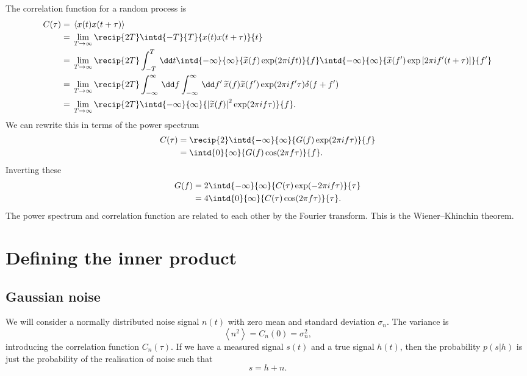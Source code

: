 The correlation function for a random process is
\begin{align}
C(\tau) = {} & \left\langle x(t)x(t + \tau)\right\rangle \\
 = {} & \lim_{T \rightarrow \infty} \recip{2T} \intd{-T}{T}{x(t)x(t + \tau)}{t} \nonumber \\
 = {} & \lim_{T \rightarrow \infty} \recip{2T} \int_{-T}^{T}\,\dd t \intd{-\infty}{\infty}{\widetilde{x}(f)\exp(2\pi ift)}{f} \intd{-\infty}{\infty}{\widetilde{x}(f')\exp\left[2\pi if'(t + \tau)\right]}{f'} \nonumber \\
 = {} & \lim_{T \rightarrow \infty} \recip{2T} \int_{-\infty}^{\infty}\,\dd f \int_{-\infty}^{\infty}\,\dd f' \, \widetilde{x}(f)\widetilde{x}(f')\exp(2\pi if'\tau)\delta(f + f') \nonumber \\
 = {} & \lim_{T \rightarrow \infty} \recip{2T} \intd{-\infty}{\infty}{\left|\widetilde{x}(f)\right|^2\exp(2\pi if\tau)}{f}.
\end{align}
We can rewrite this in terms of the power spectrum
\begin{align}
C(\tau) = {} & \recip{2} \intd{-\infty}{\infty}{G(f)\exp(2\pi if\tau)}{f} \\
 = {} & \intd{0}{\infty}{G(f)\cos(2\pi f\tau)}{f}.
\end{align}
Inverting these
\begin{align}
G(f) = {} & 2 \intd{-\infty}{\infty}{C(\tau)\exp(-2\pi i f\tau)}{\tau} \\
 = {} & 4 \intd{0}{\infty}{C(\tau) \cos(2\pi f\tau)}{\tau}.
\end{align}
The power spectrum and correlation function are related to each other by the Fourier transform. This is the Wiener–Khinchin theorem.

\section{Defining the inner product}

\subsection{Gaussian noise}

We will consider a normally distributed noise signal $n(t)$ with zero mean and standard deviation $\sigma_n$. The variance is
\begin{equation}
\left\langle n^2 \right\rangle = C_n(0) = \sigma_n^2,
\end{equation}
introducing the correlation function $C_n(\tau)$. If we have a measured signal $s(t)$ and a true signal $h(t)$, then the probability $p(s|h)$ is just the probability of the realisation of noise such that
\begin{equation}
s = h + n.
\end{equation}

